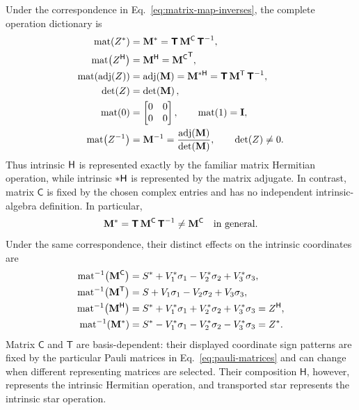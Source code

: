 Under the correspondence in Eq.\ \eqref{eq:matrix-map-inverses}, the
complete operation dictionary is
\begin{equation}
\begin{aligned}
\matf{\conj{\pv{Z}}}
&=\conj{\mat{M}}
=\Tmat\,\mconj{\mat{M}}\,\Tmat^{-1},\\
\matf{\herm{\pv{Z}}}
&=\mherm{\mat{M}}
=\mtrans{\mconj{\mat{M}}},\\
\matf{\adjf{\pv{Z}}}
&=\adjf{\mat{M}}
=\cherm{\mat{M}}
=\Tmat\,\mtrans{\mat{M}}\,\Tmat^{-1},\\
\detf{\pv{Z}}
&=\detf{\mat{M}},\\
\matf{\pv{0}}
&=
\begin{bmatrix}
0&0\\
0&0
\end{bmatrix},
\qquad
\matf{\pv{1}}=\I,\\
\matf{\pv{Z}^{-1}}
&=\mat{M}^{-1}
=\frac{\adjf{\mat{M}}}{\detf{\mat{M}}},
\qquad \detf{\pv{Z}}\neq0.
\end{aligned}
\label{eq:matrix-operation-dictionary}
\end{equation}
Thus intrinsic \(\mathsf H\) is represented exactly by the familiar matrix
Hermitian operation, while intrinsic \(*\mathsf H\) is represented by the matrix
adjugate. In contrast, matrix \(\mathsf C\) is fixed by the chosen complex
entries and has no independent intrinsic-algebra definition. In particular,
\begin{equation}
\conj{\mat{M}}
=\Tmat\,\mconj{\mat{M}}\,\Tmat^{-1}
\neq\mconj{\mat{M}}
\quad\text{in general}.
\label{eq:matrix-star-not-C}
\end{equation}
Under the same correspondence, their distinct effects on the intrinsic
coordinates are
\begin{equation}
\begin{aligned}
\operatorname{mat}^{-1}\!\left({\mathbf{M}}^{\mathsf C}\right)
&=S^*
 +V_1^*\sigma_1
 -V_2^*\sigma_2
 +V_3^*\sigma_3,\\
\operatorname{mat}^{-1}\!\left({\mathbf{M}}^{\mathsf T}\right)
&=S
 +V_1\sigma_1
 -V_2\sigma_2
 +V_3\sigma_3,\\
\operatorname{mat}^{-1}\!\left({\mathbf{M}}^{\mathsf H}\right)
&=S^*
 +V_1^*\sigma_1
 +V_2^*\sigma_2
 +V_3^*\sigma_3
=Z^{\mathsf H},\\
\operatorname{mat}^{-1}\!\left(\mathbf{M}^{*}\right)
&=S^*
 -V_1^*\sigma_1
 -V_2^*\sigma_2
 -V_3^*\sigma_3
=Z^{*}.
\end{aligned}
\label{eq:matrix-coordinate-effects}
\end{equation}
Matrix \(\mathsf C\) and \(\mathsf T\) are basis-dependent: their displayed
coordinate sign patterns are fixed by the particular Pauli matrices in
Eq.\ \eqref{eq:pauli-matrices} and can change when different representing
matrices are selected. Their composition \(\mathsf H\), however, represents
the intrinsic Hermitian operation, and transported star represents the
intrinsic star operation.

